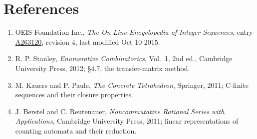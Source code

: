 \documentclass[11pt]{article}
\theoremstyle{definition}
\begin{document}
\section{References}

\begin{enumerate}

\item OEIS Foundation Inc., \emph{The On-Line Encyclopedia of Integer Sequences}, entry \href{https://oeis.org/A263120}{A263120}, revision 4, last modified Oct 10 2015.

\item R. P. Stanley, \emph{Enumerative Combinatorics}, Vol.~1, 2nd ed., Cambridge University Press, 2012; \S4.7, the transfer-matrix method.

\item M. Kauers and P. Paule, \emph{The Concrete Tetrahedron}, Springer, 2011; C-finite sequences and their closure properties.

\item J. Berstel and C. Reutenauer, \emph{Noncommutative Rational Series with Applications}, Cambridge University Press, 2011; linear representations of counting automata and their reduction.

\end{enumerate}
\end{document}
